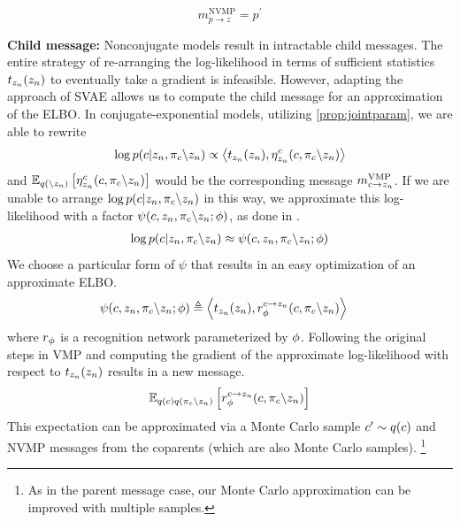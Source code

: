 \begin{equation}
    m^{\text{NVMP}}_{p \rightarrow z} = p^\prime
\end{equation}

\textbf{Child message:}
Nonconjugate models result in intractable child messages.
The entire strategy of re-arranging
the log-likelihood
in terms of sufficient statistics $t_{z_n}(z_n)$ to eventually
take a gradient is infeasible.
However, adapting the approach of SVAE allows us to
compute the child message for an approximation of the ELBO.
In conjugate-exponential models, utilizing \autoref{prop:jointparam},
we are able to rewrite
\begin{equation}
\log p(c | z_n, \pi_c \backslash z_n) \propto \left\langle t_{z_n}(z_n), \eta_{z_n}^c(c, \pi_c \backslash z_n)\right\rangle 
\end{equation}
and $\mathbb{E}_{q(\backslash z_n)}\left[\eta_{z_n}^c(c, \pi_c \backslash z_n)\right]$
would be the corresponding message $m^{\text{VMP}}_{c \rightarrow z_n}$.
If we are unable to arrange $\log p(c | z_n, \pi_c \backslash z_n)$ in this way, we approximate this log-likelihood with a factor $\psi(c, z_n, \pi_{c} \backslash z_n; \phi)$, as done in \citet{Johnson2016}.
\begin{equation}
\label{eq:rectrick}
\begin{split}
\log p(c | z_n, \pi_c \backslash z_n) &\approx \psi(c, z_n, \pi_{c} \backslash z_n; \phi) \\
\end{split}
\end{equation}
We choose a particular form of $\psi$ that results in an easy optimization
of an approximate ELBO.
\begin{equation}
\begin{split}
    \psi(c, z_n, \pi_{c} \backslash z_n; \phi) &\triangleq \left\langle t_{z_n}(z_n), r^{c \rightarrow z_n}_{\phi}(c, \pi_{c} \backslash z_n)\right\rangle
\end{split}
\end{equation}
where $r_{\phi}$ is a recognition network parameterized by $\phi$.
Following the original steps in VMP
and computing the gradient of the approximate log-likelihood
with respect to $t_{z_n}(z_n)$ results in a new message.
\begin{equation}
    \mathbb{E}_{q(c)q(\pi_c \backslash z_n)} \left[r^{c \rightarrow z_n}_{\phi}(c, \pi_{c}\backslash z_n)\right]
\end{equation}
This expectation can be approximated via a Monte Carlo sample $c' \sim q(c)$
and NVMP messages from the coparents (which are also Monte Carlo samples).
\footnote{As in the parent message case, our Monte Carlo approximation can
be improved with multiple samples.}

